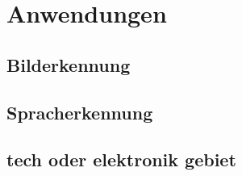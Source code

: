 \chapter{Anwendungen}
\label{cha:anwendungen}

\section{Bilderkennung}

\section{Spracherkennung}

\section{tech oder elektronik gebiet}